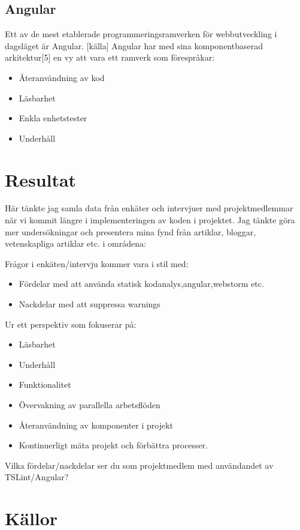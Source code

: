 \subsection{Angular}
Ett av de mest etablerade programmeringsramverken för webbutveckling i dagsläget är Angular. [källa] Angular har med sina komponentbaserad arkitektur[5] en vy att vara ett ramverk som förespråkar:

\begin{itemize}
	\item Återanvändning av kod
	\item Läsbarhet
	\item Enkla enhetstester
	\item Underhåll
\end{itemize}

\section{Resultat}
Här tänkte jag samla data från enkäter och intervjuer med projektmedlemmar när vi kommit längre i implementeringen av koden i projektet.
Jag tänkte göra mer undersökningar och presentera mina fynd från artiklar, bloggar, vetenskapliga artiklar etc. i områdena: 

Frågor i enkäten/intervju kommer vara i stil med:


\begin{itemize}
	\item Fördelar med att använda statisk kodanalys,angular,webstorm etc. 
	\item Nackdelar med att suppressa warnings 
\end{itemize}

Ur ett perspektiv som fokuserar på: 
\begin{itemize}
	\item Läsbarhet 
	\item Underhåll
	\item Funktionalitet
	\item Övervakning av parallella arbetsflöden
	\item Återanvändning av komponenter i projekt
	\item Kontinuerligt mäta projekt och förbättra processer.
\end{itemize}

Vilka fördelar/nackdelar ser du som projektmedlem med användandet av TSLint/Angular?



\section{Källor}


